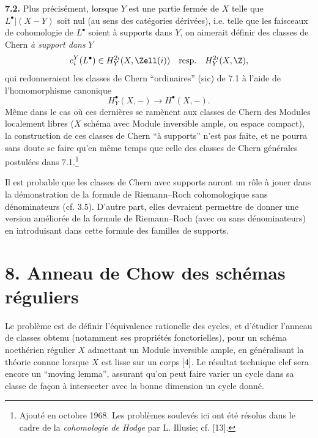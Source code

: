 \textbf{7.2.} Plus précisément, lorsque $Y$ est une partie fermée de $X$ telle que $L^\bullet|(X-Y)$ soit nul (au sens des catégories dérivées), i.e. telle que les faisceaux de cohomologie de $L^\bullet$ soient à supports dans $Y$, on aimerait définir des classes de Chern \emph{à support dans} $Y$
\[
 c_i^Y(L^\bullet)\in H_Y^{2i}(X,\Zell(i))\quad\text{resp.}\quad H_Y^{2i}(X,\Z),
\]
qui redonneraient les classes de Chern ``ordinaires'' (sic) de 7.1 à l'aide de l'homomorphisme canonique
\[
 H_Y^\bullet(X,-)\longrightarrow H^\bullet(X,-).
\]
Même
dans le cas où ces dernières se ramènent aux classes de Chern des Modules localement libres ($X$ schéma avec Module inversible ample, ou espace compact), la construction de ces classes de Chern ``à supports'' n'est pas faite, et ne pourra sans doute se faire qu'en même temps que celle des classes de Chern générales postulées dans 7.1.\footnote{Ajouté en octobre 1968. Les problèmes soulevés ici ont été résolus dans le cadre de la \emph{cohomologie de Hodge} par L. Illusie; cf. [13].}

Il est probable que les classes de Chern avec supports auront un rôle à jouer dans la démonstration de la formule de Riemann--Roch cohomologique sans dénominateurs (cf. 3.5). D'autre part, elles devraient permettre de donner une version améliorée de la formule de Riemann--Roch (avec ou sans dénominateurs) en introduisant dans cette formule des familles de supports.

\section*{8. Anneau de Chow des schémas réguliers}

Le problème est de définir l'équivalence rationelle des cycles, et d'étudier l'anneau de classes obtenu (notamment ses propriétés fonctorielles), pour un schéma noethérien régulier $X$ admettant un Module inversible ample, en généralisant la théorie connue lorsque $X$ est lisse sur un corps [4]. Le résultat technique clef sera encore un ``moving lemma'', assurant qu'on peut faire varier un cycle dans sa classe de façon à intersecter avec la bonne dimension un cycle donné.

